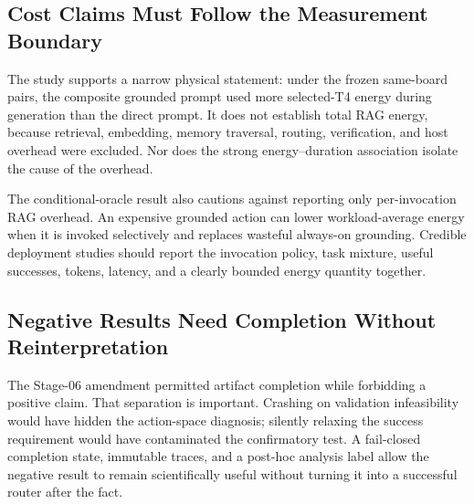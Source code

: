 \subsection{Cost Claims Must Follow the Measurement Boundary}

The study supports a narrow physical statement: under the frozen same-board pairs,
the composite grounded prompt used more selected-T4 energy during generation than
the direct prompt. It does not establish total RAG energy, because retrieval,
embedding, memory traversal, routing, verification, and host overhead were excluded.
Nor does the strong energy--duration association isolate the cause of the overhead.

The conditional-oracle result also cautions against reporting only per-invocation
RAG overhead. An expensive grounded action can lower workload-average energy when
it is invoked selectively and replaces wasteful always-on grounding. Credible
deployment studies should report the invocation policy, task mixture, useful
successes, tokens, latency, and a clearly bounded energy quantity together.

\subsection{Negative Results Need Completion Without Reinterpretation}

The Stage-06 amendment permitted artifact completion while forbidding a positive
claim. That separation is important. Crashing on validation infeasibility would
have hidden the action-space diagnosis; silently relaxing the success requirement
would have contaminated the confirmatory test. A fail-closed completion state,
immutable traces, and a post-hoc analysis label allow the negative result to remain
scientifically useful without turning it into a successful router after the fact.
